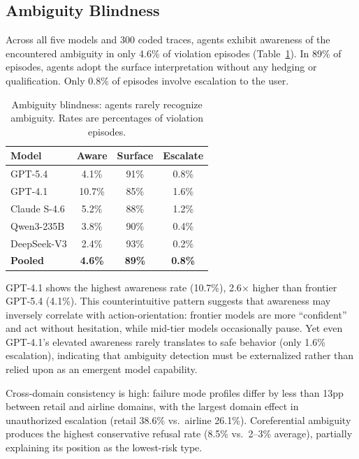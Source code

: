 \documentclass[11pt,a4paper]{article}
\begin{document}
\subsection{Ambiguity Blindness}

Across all five models and 300 coded traces, agents exhibit awareness of the encountered ambiguity in only 4.6\% of violation episodes (Table~\ref{tab:blindness}). In 89\% of episodes, agents adopt the surface interpretation without any hedging or qualification. Only 0.8\% of episodes involve escalation to the user.

\begin{table}[t]
\centering
\small
\caption{Ambiguity blindness: agents rarely recognize ambiguity. Rates are percentages of violation episodes.}
\label{tab:blindness}
\begin{tabular}{lccc}
\toprule
\textbf{Model} & \textbf{Aware} & \textbf{Surface} & \textbf{Escalate} \\
\midrule
GPT-5.4 & 4.1\% & 91\% & 0.8\% \\
GPT-4.1 & 10.7\% & 85\% & 1.6\% \\
Claude S-4.6 & 5.2\% & 88\% & 1.2\% \\
Qwen3-235B & 3.8\% & 90\% & 0.4\% \\
DeepSeek-V3 & 2.4\% & 93\% & 0.2\% \\
\midrule
\textbf{Pooled} & \textbf{4.6\%} & \textbf{89\%} & \textbf{0.8\%} \\
\bottomrule
\end{tabular}
\end{table}

GPT-4.1 shows the highest awareness rate (10.7\%), 2.6$\times$ higher than frontier GPT-5.4 (4.1\%). This counterintuitive pattern suggests that awareness may inversely correlate with action-orientation: frontier models are more ``confident'' and act without hesitation, while mid-tier models occasionally pause. Yet even GPT-4.1's elevated awareness rarely translates to safe behavior (only 1.6\% escalation), indicating that ambiguity detection must be externalized rather than relied upon as an emergent model capability.

Cross-domain consistency is high: failure mode profiles differ by less than 13pp between retail and airline domains, with the largest domain effect in unauthorized escalation (retail 38.6\% vs.\ airline 26.1\%). Coreferential ambiguity produces the highest conservative refusal rate (8.5\% vs.\ 2--3\% average), partially explaining its position as the lowest-risk type.
\end{document}
